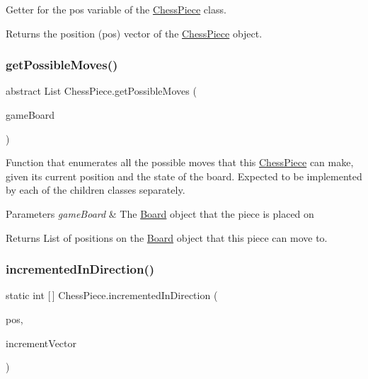 Getter for the \textquotesingle{}pos\textquotesingle{} variable of the \mbox{\hyperlink{class_chess_piece}{Chess\+Piece}} class. \begin{DoxyReturn}{Returns}
the position (\textquotesingle{}pos\textquotesingle{}) vector of the \mbox{\hyperlink{class_chess_piece}{Chess\+Piece}} object. 
\end{DoxyReturn}
\mbox{\label{class_chess_piece_ae8ea6bb48b9892a4f907804586ed9786}} 
\subsubsection{\texorpdfstring{get\+Possible\+Moves()}{getPossibleMoves()}}
{\footnotesize\ttfamily abstract List Chess\+Piece.\+get\+Possible\+Moves (\begin{DoxyParamCaption}\item[{@Not\+Null \mbox{\hyperlink{class_board}{Board}}}]{game\+Board }\end{DoxyParamCaption})\hspace{0.3cm}{\ttfamily [abstract]}}

Function that enumerates all the possible moves that this \mbox{\hyperlink{class_chess_piece}{Chess\+Piece}} can make, given its current position and the state of the board. Expected to be implemented by each of the children classes separately. 
\begin{DoxyParams}{Parameters}
{\em game\+Board} & The \mbox{\hyperlink{class_board}{Board}} object that the piece is placed on \\
\hline
\end{DoxyParams}
\begin{DoxyReturn}{Returns}
List of positions on the \mbox{\hyperlink{class_board}{Board}} object that this piece can move to. 
\end{DoxyReturn}
\mbox{\label{class_chess_piece_aea17bf7ab9ffbb479975f5bedb66e359}} 
\subsubsection{\texorpdfstring{incremented\+In\+Direction()}{incrementedInDirection()}}
{\footnotesize\ttfamily static int \mbox{[}$\,$\mbox{]} Chess\+Piece.\+incremented\+In\+Direction (\begin{DoxyParamCaption}\item[{@Not\+Null int \mbox{[}$\,$\mbox{]}}]{pos,  }\item[{@Not\+Null int \mbox{[}$\,$\mbox{]}}]{increment\+Vector }\end{DoxyParamCaption})\hspace{0.3cm}{\ttfamily [static]}}

